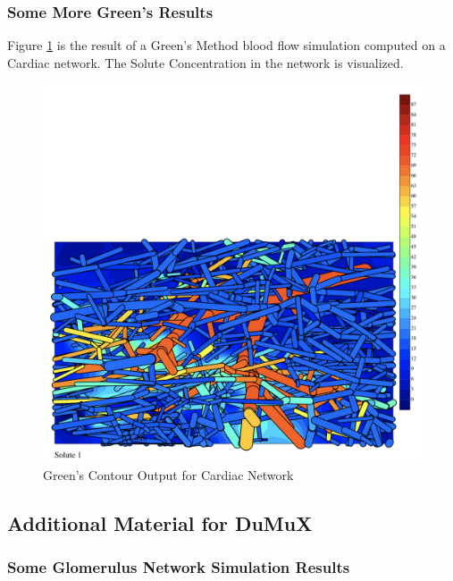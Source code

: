 \subsubsection{Some More Green's Results}

Figure \ref{fig:Contour_Cardiac}  is the result of a Green's Method blood flow simulation computed on a Cardiac network. The Solute Concentration in the network is visualized.\\
\begin{figure}[h]
\centering
\includegraphics[width=170mm]{Contour_Cardiac}
\caption{Green's Contour Output for Cardiac Network}
\label{fig:Contour_Cardiac}
\end{figure}

\subsection{Additional Material for DuMuX}

\newpage
\subsubsection{Some Glomerulus Network Simulation Results}

